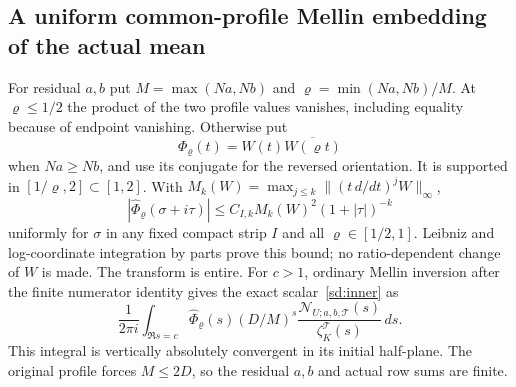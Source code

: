 \subsection{A uniform common-profile Mellin embedding of the actual mean}
For residual $a,b$ put $M=\max(Na,Nb)$ and
$\varrho=\min(Na,Nb)/M$. At $\varrho\le1/2$ the product of the two
profile values vanishes, including equality because of endpoint
vanishing. Otherwise put
\[
 \Phi_\varrho(t)=W(t)\overline{W(\varrho t)}
\]
when $Na\ge Nb$, and use its conjugate for the reversed orientation.
It is supported in $[1/\varrho,2]\subset[1,2]$.
With $M_k(W)=\max_{j\le k}\|(t\,d/dt)^jW\|_\infty$,
\begin{equation}\label{sd:profile-mellin}
 |\widehat\Phi_\varrho(\sigma+i\tau)|
 \le C_{I,k}M_k(W)^2(1+|\tau|)^{-k}
\end{equation}
uniformly for $\sigma$ in any fixed compact strip $I$ and all
$\varrho\in[1/2,1]$. Leibniz and log-coordinate integration by parts
prove this bound; no ratio-dependent change of $W$ is made.
The transform is entire. For $c>1$, ordinary Mellin inversion after the
finite numerator identity gives the exact scalar~\eqref{sd:inner} as
\begin{equation}\label{sd:mellin}
 \frac1{2\pi i}\int_{\Re s=c}
 \widehat\Phi_\varrho(s)(D/M)^s
 \frac{\mathcal N_{U;a,b,\mathcal T}(s)}
                      {\zeta_K^{\mathcal T}(s)}\,ds.
\end{equation}
This integral is vertically absolutely convergent in its initial
half-plane. The original profile forces $M\le2D$, so the residual $a,b$
and actual row sums are finite.

